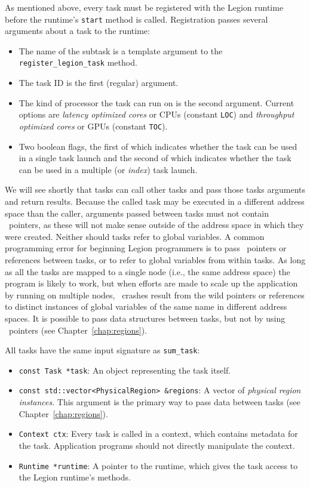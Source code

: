 As mentioned above, every task must be registered with the Legion runtime before
the runtime's {\tt start} method is called.  Registration passes several arguments about a
task to the runtime:
\begin{itemize}
\item The name of the subtask is a template argument to the {\tt register\_legion\_task} method.

\item The task ID is the first (regular) argument.

\item The kind of processor the task can run on is the second argument.  Current options are
{\em latency optimized cores} or CPUs (constant {\tt LOC}) and {\em throughput optimized cores} or GPUs
(constant {\tt TOC}).

\item Two boolean flags, the first of which indicates whether the task can be used in a single task
launch and the second of which indicates whether the task can be used in a multiple (or {\em index}) task
launch.
\end{itemize}

We will see shortly that tasks can call other tasks and pass
those tasks arguments and return results.  Because the called task may
be executed in a different address space than the caller, arguments
passed between tasks must not contain \Cpp\ pointers, as these will
not make sense outside of the address space in which they were
created.  Neither should tasks refer to global variables. A common
programming error for beginning Legion programmers is to pass
\Cpp\ pointers or references between tasks, or to refer to global
variables from within tasks.  As long as all the tasks are mapped to a
single node (i.e., the same address space) the program is likely to
work, but when efforts are made to scale up the application by running
on multiple nodes, \Cpp\ crashes result from the wild pointers or
references to distinct instances of global variables of the same name
in different address spaces.  It is possible to pass data structures
between tasks, but not by using \Cpp\ pointers (see
Chapter~\ref{chap:regions}).

All tasks have the same input signature as {\tt sum\_task}:
\begin{itemize}

\item {\tt const Task *task}: An object representing the task itself. 

\item {\tt const std::vector<PhysicalRegion> \&regions}: A vector of {\em physical region instances}.  This argument is the
primary way to pass data between tasks (see Chapter~\ref{chap:regions}).

\item {\tt Context ctx}: Every task is called in a context, which contains metadata for the task.  Application programs
should not directly manipulate the context.

\item {\tt Runtime *runtime}: A pointer to the runtime, which gives the task access to the Legion runtime's methods.

\end{itemize}

